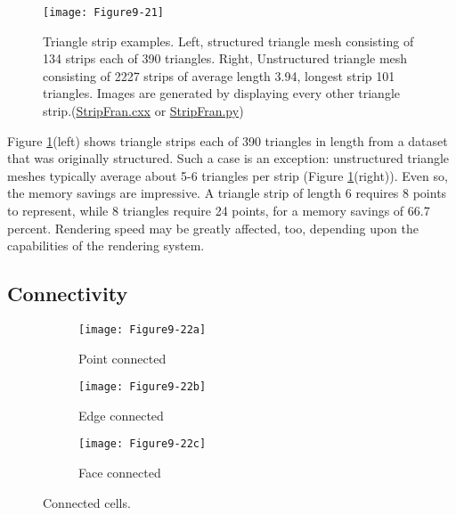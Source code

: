 \begin{figure}[!htb]
	\centering
	\texttt{[image: Figure9-21]}
	\caption{Triangle strip examples. Left, structured triangle mesh consisting of 134 strips each of 390 triangles. Right, Unstructured triangle mesh consisting of 2227 strips of average length 3.94, longest strip 101 triangles. Images are generated by displaying every other triangle strip.(\href{https://lorensen.github.io/VTKExamples/site/Cxx/Rendering/StripFran/}{StripFran.cxx} or \href{https://lorensen.github.io/VTKExamples/site/Python/Rendering/StripFran/}{StripFran.py})}
	\label{fig:Figure9-21}
\end{figure}


Figure \ref{fig:Figure9-21}(left) shows triangle strips each of 390 triangles in length from a dataset that was originally structured. Such a case is an exception: unstructured triangle meshes typically average about 5-6 triangles per strip (Figure \ref{fig:Figure9-21}(right)). Even so, the memory savings are impressive. A triangle strip of length 6 requires 8 points to represent, while 8 triangles require 24 points, for a memory savings of 66.7 percent. Rendering speed may be greatly affected, too, depending upon the capabilities of the rendering system.

\subsection{Connectivity}

\begin{figure}[htb]
	\begin{subfigure}[h]{0.32\linewidth}
		\texttt{[image: Figure9-22a]}
		\captionsetup{justification=centering}
		\caption*{Point connected}
		\label{fig:Figure9-22a}
	\end{subfigure}
	\hfill
	\begin{subfigure}[h]{0.32\linewidth}
		\texttt{[image: Figure9-22b]}
		\captionsetup{justification=centering}
		\caption*{Edge connected}
		\label{fig:Figure9-22b}
	\end{subfigure}
	\begin{subfigure}[h]{0.32\linewidth}
		\texttt{[image: Figure9-22c]}
		\captionsetup{justification=centering}
		\caption*{Face connected}
		\label{fig:Figure9-22c}
	\end{subfigure}
	\caption{Connected cells.}\label{fig:Figure9-22}
\end{figure}


